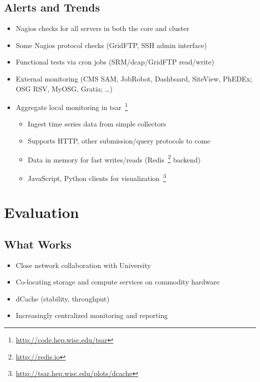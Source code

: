 \documentclass{beamer}
\begin{document}
\subsection{Alerts and Trends} %
\begin{frame}
\begin{itemize}
	\item Nagios checks for all servers in both the core and cluster
	\item Some Nagios protocol checks (GridFTP, SSH admin interface)
	\item Functional tests via cron jobs (SRM/dcap/GridFTP read/write)
	\item External monitoring (CMS SAM, JobRobot, Dashboard, SiteView, PhEDEx; OSG RSV, MyOSG, Gratia; \ldots{})
	\item Aggregate local monitoring in tsar~\footnote{\url{http://code.hep.wisc.edu/tsar}}
	\begin{itemize}
		\item Ingest time series data from simple collectors
		\item Supports HTTP, other submission/query protocols to come
		\item Data in memory for fast writes/reads (Redis~\footnote{\url{http://redis.io}} backend)
		\item JavaScript, Python clients for visualization~\footnote{\url{http://tsar.hep.wisc.edu/plots/dcache}}
	\end{itemize}
\end{itemize}
\end{frame}

\section{Evaluation}
\subsection{What Works}
\begin{frame}
\begin{itemize}
	\item Close network collaboration with University
	\item Co-locating storage and compute services on commodity hardware
	\item dCache (stability, throughput)
	\item Increasingly centralized monitoring and reporting
\end{itemize}
\end{frame}
\end{document}
